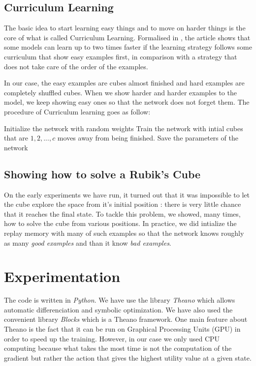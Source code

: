 \documentclass{article} %
\begin{document}
\subsection{Curriculum Learning}
The basic idea to start learning easy things and to move on harder things is the core of what is called Curriculum Learning. Formalised in \cite{curriculum}, the article shows that some models can learn up to two times faster if the learning strategy follows some curriculum that show easy examples first, in comparison with a strategy that does not take care of the order of the examples.

In our case, the easy examples are cubes almost finished and hard examples are completely shuffled cubes. When we show harder and harder examples to the model, we keep showing easy ones so that the network does not forget them. The procedure of Curriculum learning goes as follow:

\begin{algorithm}
\begin{algorithmic}[1]
\STATE Initialize the network with random weights
\STATE Train the network with intial cubes that are $1, 2, ..., c$ moves away from being finished.
\STATE Save the parameters of the network

\ENDFOR
\end{algorithmic}
\end{algorithm}

\subsection{Showing how to solve a Rubik's Cube}
On the early experiments we have run, it turned out that it was impossible to let the cube explore the space from it's initial position : there is very little chance that it reaches the final state. To tackle this problem, we showed, many times, how to solve the cube from various positions. In practice, we did intialize the replay memory with many of such examples so that the  network knows roughly as many \textit{good examples} and than it know \textit{bad examples}.


\section{Experimentation}

The code is written in \textit{Python}. We have use the library \textit{Theano} which allows automatic differenciation and symbolic optimization. We have also used the convenient library \textit{Blocks} which is a Theano framework. One main feature about Theano is the fact that it can be run on Graphical Processing Units (GPU) in order to speed up the training. However, in our case we only used CPU computing because what takes the most time is not the computation of the gradient but rather the action that gives the highest utility value at a given state.
\end{document}
